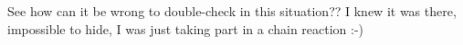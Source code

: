 \begin{footnotesize}
\begin{sffamily}
See how can it be wrong to double-check in this situation?? I knew it was there, impossible to hide, I was just taking part in a chain reaction :-)

\end{sffamily}
\end{footnotesize}

